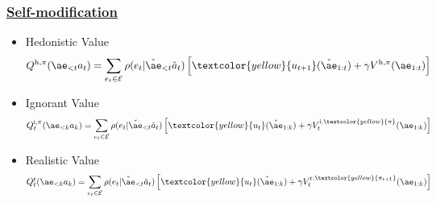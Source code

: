 \documentclass[UTF8,11pt,colorlinks,compress,openany]{beamer}%
\begin{document}
\begin{frame}\frametitle{\href{http://www.tomeveritt.se/}{Self-modification}}
\begin{definition}\hfill
\begin{itemize}
\item Hedonistic Value
\[Q^{\mathrm{h},\pi}(\ae_{<t}a_t)
=\sum\limits_{e_t\in\mathcal{E}}\rho(e_t|\check{\ae}_{<t}\check{a}_t)\left[\textcolor{yellow}{u_{t+1}}(\check{\ae}_{1:t}) + \gamma V^{\mathrm{h},\pi}(\ae_{1:t})\right]\]
\item Ignorant Value
\[Q_t^{\mathrm{i},\pi}(\ae_{<k}a_k)
=\sum\limits_{e_t\in\mathcal{E}}\rho(e_t|\check{\ae}_{<t}\check{a}_t)\left[\textcolor{yellow}{u_t}(\check{\ae}_{1:k}) + \gamma V_t^{\mathrm{i},\textcolor{yellow}{\pi}}(\ae_{1:k})\right]\]
\item Realistic Value
\[Q_t^{\mathrm{r}}(\ae_{<k}a_k)
=\sum\limits_{e_t\in\mathcal{E}}\rho(e_t|\check{\ae}_{<t}\check{a}_t)\left[\textcolor{yellow}{u_t}(\check{\ae}_{1:k}) +
 \gamma V_t^{\mathrm{r},\textcolor{yellow}{\pi_{t+1}}}(\ae_{1:k})\right]\]
\end{itemize}
\end{definition}
\end{frame}
\end{document}

